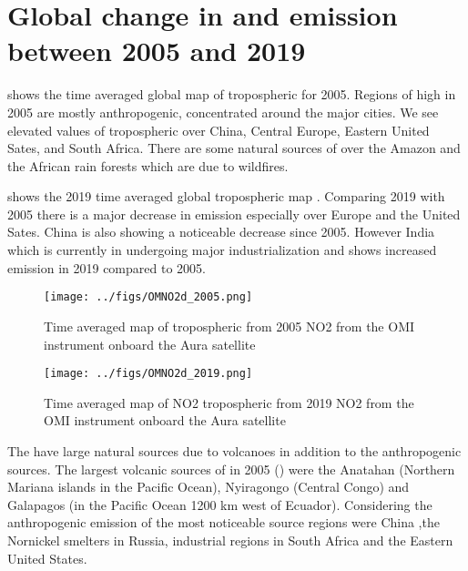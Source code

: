\section*{Global change in  and  emission between 2005 and 2019} 
 shows the time averaged global map of tropospheric 
 for 2005. Regions of high  in 2005 are mostly
anthropogenic, concentrated around the major cities. We see elevated values of tropospheric  over 
China, Central Europe, Eastern United Sates, and South Africa. There 
are some natural sources of  over the Amazon and the African rain forests which are due 
to wildfires.  

 shows the 2019 time averaged global tropospheric
map  . Comparing 2019 with 2005 there is a major 
decrease in  emission especially over Europe and the United Sates. China is also 
showing a noticeable decrease since 2005. However India which is currently in undergoing 
major industrialization and shows increased  emission in 2019 compared to 2005. 

\begin{figure}[htbp]
    \centering
        \texttt{[image: ../figs/OMNO2d\_2005.png]}
    \caption{Time averaged map of  tropospheric from 2005 NO2 from the OMI instrument
    onboard the Aura satellite   }
    \label{fig:OMI_global_2005NO2}
\end{figure}

\begin{figure}[htpb]
    \centering
        \texttt{[image: ../figs/OMNO2d\_2019.png]}
    \caption{Time averaged map of NO2 tropospheric from 2019 NO2 from the OMI instrument  
    onboard the Aura satellite}
    \label{fig:OMI_global_2019NO2}
\end{figure}

The  have large natural sources due to volcanoes in addition to the
anthropogenic sources. The largest volcanic sources of  
in 2005 () were the Anatahan (Northern Mariana 
islands in the Pacific Ocean), Nyiragongo (Central Congo) and Galapagos 
(in the Pacific Ocean 1200 km west of Ecuador). Considering the anthropogenic 
emission of  the most noticeable source regions were China 
,the Nornickel smelters in Russia, industrial regions in South Africa and 
the Eastern United States.   

